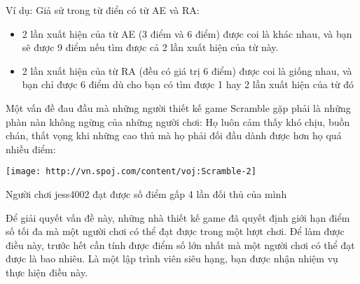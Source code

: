 Ví dụ: Giả sử trong từ điển có từ AE và RA:
\begin{itemize}
	\item 2 lần xuất hiện của từ AE (3 điểm và 6 điểm) được coi là khác nhau, và bạn sẽ được 9 điểm nếu tìm được cả 2 lần xuất hiện của từ này.
	\item 2 lần xuất hiện của từ RA (đều có giá trị 6 điểm) được coi là giống nhau, và bạn chỉ được 6 điểm dù cho bạn có tìm được 1 hay 2 lần xuất hiện của từ đó
\end{itemize}
Một vấn đề đau đầu mà những người thiết kế game Scramble gặp phải là những phàn nàn không ngừng của những người chơi: Họ luôn cảm thấy khó chịu, buồn chán, thất vọng khi những cao thủ mà họ phải đối đầu dành được hơn họ quá nhiều điểm:


\texttt{[image: http://vn.spoj.com/content/voj:Scramble-2]}

Người chơi jess4002 đạt được số điểm gấp 4 lần đối thủ của mình

Để giải quyết vấn đề này, những nhà thiết kế game đã quyết định giới hạn điểm số tối đa mà một người chơi có thể đạt được trong một lượt chơi. Để làm được điều này, trước hết cần tính được điểm số lớn nhất mà một người chơi có thể đạt được là bao nhiêu. Là một lập trình viên siêu hạng, bạn được nhận nhiệm vụ thực hiện điều này.

